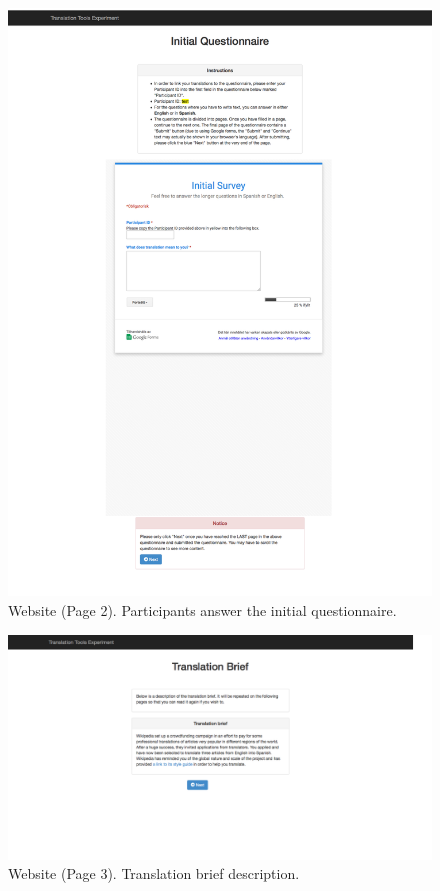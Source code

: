 \begin{figure}[h]
\myfloatalign
\includegraphics[width=\textwidth]{img/web/web_2.png}
\caption{Website (Page 2). Participants answer the initial questionnaire.}
\label{fig:web_initial}
\end{figure}

\begin{figure}[h]
\myfloatalign
\includegraphics[width=\textwidth]{img/web/web_3.png}
\caption{Website (Page 3). Translation brief description.}
\label{fig:web_brief}
\end{figure}


